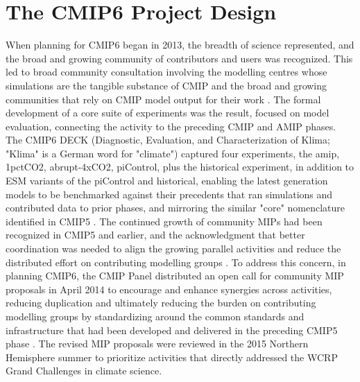\documentclass[gmd, preprint]{copernicus}
\begin{document}
\section{The CMIP6 Project Design}
\label{sec:cmip6ProjectDesign}

When planning for CMIP6 began in 2013, the breadth of science represented, and the broad and growing community of contributors and users was recognized. This led to broad community consultation involving the modelling centres whose simulations are the tangible substance of CMIP and the broad and growing communities that rely on CMIP model output for their work \citep{eyring_overview_2016}. The formal development of a core suite of experiments was the result, focused on model evaluation, connecting the activity to the preceding CMIP and AMIP phases. The CMIP6 DECK (Diagnostic, Evaluation, and Characterization of Klima; "Klima" is a German word for "climate") captured four experiments, the amip, 1pctCO2, abrupt-4xCO2, piControl, plus the historical experiment, in addition to ESM variants of the piControl and historical, enabling the latest generation models to be benchmarked against their precedents that ran simulations and contributed data to prior phases, and mirroring the similar "core" nomenclature identified in CMIP5 \citep{stouffer_cmip5_2011}. The continued growth of community MIPs had been recognized in CMIP5 and earlier, and the acknowledgment that better coordination was needed to align the growing parallel activities and reduce the distributed effort on contributing modelling groups \citep{eyring_overview_2016}. To address this concern, in planning CMIP6, the CMIP Panel distributed an open call for community MIP proposals in April 2014 to encourage and enhance synergies across activities, reducing duplication and ultimately reducing the burden on contributing modelling groups by standardizing around the common standards and infrastructure that had been developed and delivered in the preceding CMIP5 phase \citep{eyring_overview_2016}. The revised MIP proposals were reviewed in the 2015 Northern Hemisphere summer to prioritize activities that directly addressed the WCRP Grand Challenges in climate science.
\end{document}
